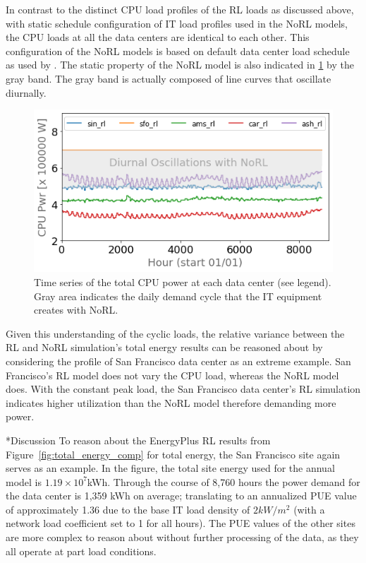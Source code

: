 \documentclass[twocolumn, a4paper,10pt]{article}
\makeatletter
\renewcommand\section{\@startsection{section}{1}{\z@}{0.25cm}{0.1cm}{\normalfont\large\bfseries}}
\makeatother
\begin{document}
In contrast to the distinct CPU load profiles of the RL loads as discussed above, with static schedule configuration of IT load profiles used in the NoRL models, the CPU loads at all the data centers are identical to each other. This configuration of the NoRL models is based on default data center load schedule as used by \citep{moriyama18}. The static property of the NoRL model is also indicated in \ref{fig:cpu_comps} by the gray band. The gray band is actually composed of line curves that oscillate diurnally.


\begin{figure}
  \centering
  \includegraphics[scale=0.45]{img/cpu_comps.png}
  \caption{Time series of the total CPU power at each data center (see legend). Gray area indicates the daily demand cycle that the IT equipment creates with NoRL.}
  \label{fig:cpu_comps}
  \end{figure}

  Given this understanding of the cyclic loads, the relative variance between the RL and NoRL simulation’s total energy results can be reasoned about by considering the profile of San Francisco data center as an extreme example. San Francisco’s RL model does not vary the CPU load, whereas the NoRL model does. With the constant peak load, the San Francisco data center’s RL simulation indicates higher utilization than the NoRL model therefore demanding more power.


\section*{Discussion}
To reason about the EnergyPlus RL results from Figure~\ref{fig:total_energy_comp} for total energy, the San Francisco site again serves as an example. In the figure, the total site energy used for the annual model is $1.19 \times 10^7$kWh. Through the course of 8,760 hours the power demand for the data center is 1,359 kWh on average; translating to an annualized PUE value of approximately 1.36 due to the base IT load density of $2 kW/m^2$ (with a network load coefficient set to 1 for all hours). The PUE values of the other sites are more complex to reason about without further processing of the data, as they all operate at part load conditions.
\end{document}
